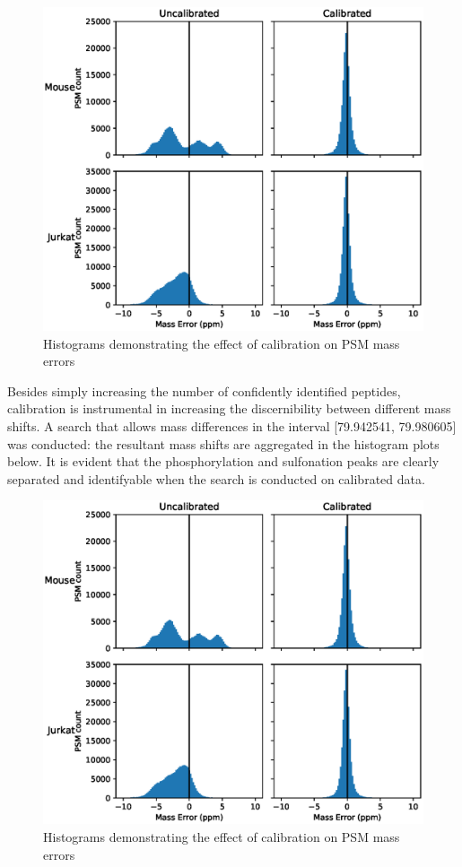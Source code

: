 \documentclass[journal=jprobs,manuscript=article]{achemso}
\begin{document}
\begin{figure}
  \includegraphics{fig2-calibrationQuality.eps}
  \caption{Histograms demonstrating the effect of calibration on PSM mass errors}
  \label{fgr:figure1}
\end{figure}

Besides simply increasing the number of confidently identified peptides, calibration is instrumental in increasing the discernibility between different mass shifts. A search that allows mass differences in the interval [79.942541, 79.980605] was conducted: the resultant mass shifts are aggregated in the histogram plots below. It is evident that the phosphorylation and sulfonation peaks are clearly separated and identifyable when the search is conducted on calibrated data.


\begin{figure}
  \includegraphics{fig2-calibrationQuality.eps}
  \caption{Histograms demonstrating the effect of calibration on PSM mass errors}
  \label{fgr:figure1}
\end{figure}
\newpage
\end{document}
